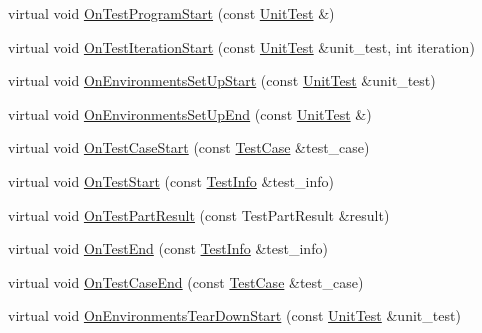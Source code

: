 \begin{DoxyCompactItemize}
\item 
virtual void \mbox{\hyperlink{classtesting_1_1internal_1_1_pretty_unit_test_result_printer_a7a6b6de195b4ef3c9f2edd2e6c270f3e}{On\+Test\+Program\+Start}} (const \mbox{\hyperlink{classtesting_1_1_unit_test}{Unit\+Test}} \&)
\item 
virtual void \mbox{\hyperlink{classtesting_1_1internal_1_1_pretty_unit_test_result_printer_ae1fb592555956930ad56e85727a86e7a}{On\+Test\+Iteration\+Start}} (const \mbox{\hyperlink{classtesting_1_1_unit_test}{Unit\+Test}} \&unit\+\_\+test, int iteration)
\item 
virtual void \mbox{\hyperlink{classtesting_1_1internal_1_1_pretty_unit_test_result_printer_af794208caa6ea4fcd91a4d4da0ec93c0}{On\+Environments\+Set\+Up\+Start}} (const \mbox{\hyperlink{classtesting_1_1_unit_test}{Unit\+Test}} \&unit\+\_\+test)
\item 
virtual void \mbox{\hyperlink{classtesting_1_1internal_1_1_pretty_unit_test_result_printer_aadba892f02606a8b0c5f5982b3553aac}{On\+Environments\+Set\+Up\+End}} (const \mbox{\hyperlink{classtesting_1_1_unit_test}{Unit\+Test}} \&)
\item 
virtual void \mbox{\hyperlink{classtesting_1_1internal_1_1_pretty_unit_test_result_printer_adcb68c729565d4bcdf8418a52902c3de}{On\+Test\+Case\+Start}} (const \mbox{\hyperlink{classtesting_1_1_test_case}{Test\+Case}} \&test\+\_\+case)
\item 
virtual void \mbox{\hyperlink{classtesting_1_1internal_1_1_pretty_unit_test_result_printer_a8133130bf8254da0a78e39ac34155410}{On\+Test\+Start}} (const \mbox{\hyperlink{classtesting_1_1_test_info}{Test\+Info}} \&test\+\_\+info)
\item 
virtual void \mbox{\hyperlink{classtesting_1_1internal_1_1_pretty_unit_test_result_printer_a9c7ca0e58ea0fc96d635ed0cea410ed9}{On\+Test\+Part\+Result}} (const Test\+Part\+Result \&result)
\item 
virtual void \mbox{\hyperlink{classtesting_1_1internal_1_1_pretty_unit_test_result_printer_a6d4e21b076982d9eefb30373f1f5b6d2}{On\+Test\+End}} (const \mbox{\hyperlink{classtesting_1_1_test_info}{Test\+Info}} \&test\+\_\+info)
\item 
virtual void \mbox{\hyperlink{classtesting_1_1internal_1_1_pretty_unit_test_result_printer_a7a62fe58fa6f6aace813eb62b31e5a51}{On\+Test\+Case\+End}} (const \mbox{\hyperlink{classtesting_1_1_test_case}{Test\+Case}} \&test\+\_\+case)
\item 
virtual void \mbox{\hyperlink{classtesting_1_1internal_1_1_pretty_unit_test_result_printer_a30703edd3f8a434035a4977eeb49918d}{On\+Environments\+Tear\+Down\+Start}} (const \mbox{\hyperlink{classtesting_1_1_unit_test}{Unit\+Test}} \&unit\+\_\+test)

\end{DoxyCompactItemize}
